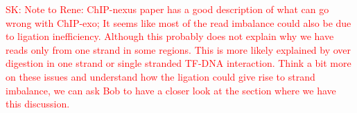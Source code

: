 \documentclass{bmcart}
\newcommand{\SK}[1]{\textcolor{red}{SK: #1}}
\newcommand{\RW}[1]{\textcolor{blue}{RW: #1}}
\begin{document}
\SK{Note to Rene: ChIP-nexus paper has a good description of what can
  go wrong with ChIP-exo; It seems like most of the read imbalance
  could also be due to ligation inefficiency. Although this probably
  does not explain why we have reads only from one strand in some
  regions. This is more likely explained by over digestion in one
  strand or single stranded TF-DNA interaction. Think a bit more on
  these issues and understand how the ligation could give rise to
  strand imbalance, we can ask Bob to have a closer look at the
  section where we have this discussion.}




\end{document}
